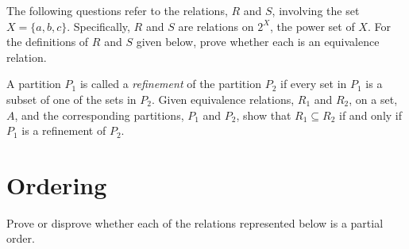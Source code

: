 \documentclass[addpoints]{exam}
\begin{document}
\begin{questions}
\question The following questions refer to the relations, $R$ and $S$, involving the set $X = \{a, b, c\}$. Specifically, $R$ and $S$ are relations on $2^X$, the power set of $X$. For the definitions of $R$ and $S$ given below, prove whether each is an equivalence relation.
  \begin{multicols}{2}
  \end{multicols}
  \begin{solution}
    \begin{parts}
    \part 
    \part 
    \end{parts}
  \end{solution}

\question[5] A partition $P_1$ is called a \textit{refinement} of the partition $P_2$ if every set in $P_1$ is a subset of one of the sets in $P_2$. Given equivalence relations, $R_1$ and $R_2$, on a set, $A$, and the corresponding partitions, $P_1$ and $P_2$, show that $R_1 \subseteq R_2$ if and only if $P_1$ is a refinement of $P_2$.
  \begin{solution}
  \end{solution}

\section{Ordering}
  
\question Prove or disprove whether each of the relations represented below is a partial order.
  \begin{multicols}{3}
\end{multicols}
\end{questions}
\end{document}
